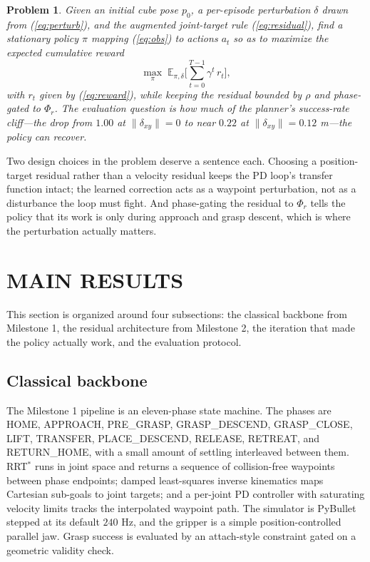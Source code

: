 \documentclass[letterpaper, 11 pt, journal, twoside]{IEEEtran}
\newtheorem{problem}{Problem}
\def\rep#1{(\ref{#1})}
\begin{document}
\begin{problem}
\label{prob:main}
Given an initial cube pose $p_0$, a per-episode perturbation $\delta$ drawn from \rep{eq:perturb}, and the augmented joint-target rule \rep{eq:residual}, find a stationary policy $\pi$ mapping \rep{eq:obs} to actions $a_t$ so as to maximize the expected cumulative reward
\begin{equation}
\max_{\pi} \; \mathbb{E}_{\pi, \delta}\Bigg[\sum_{t=0}^{T-1} \gamma^{t}\, r_t\Bigg],
\label{eq:J}
\end{equation}
with $r_t$ given by \rep{eq:reward}, while keeping the residual bounded by $\rho$ and phase-gated to $\Phi_r$. The evaluation question is how much of the planner's success-rate cliff---the drop from $1.00$ at $\|\delta_{xy}\| = 0$ to near $0.22$ at $\|\delta_{xy}\| = 0.12$ m---the policy can recover.
\end{problem}

Two design choices in the problem deserve a sentence each. Choosing a position-target residual rather than a velocity residual keeps the PD loop's transfer function intact; the learned correction acts as a waypoint perturbation, not as a disturbance the loop must fight. And phase-gating the residual to $\Phi_r$ tells the policy that its work is only during approach and grasp descent, which is where the perturbation actually matters.

\section{MAIN RESULTS}
\label{sec:main}

This section is organized around four subsections: the classical backbone from Milestone 1, the residual architecture from Milestone 2, the iteration that made the policy actually work, and the evaluation protocol.

\subsection{Classical backbone}
\label{sec:backbone}

The Milestone 1 pipeline is an eleven-phase state machine. The phases are HOME, APPROACH, PRE\_GRASP, GRASP\_DESCEND, GRASP\_CLOSE, LIFT, TRANSFER, PLACE\_DESCEND, RELEASE, RETREAT, and RETURN\_HOME, with a small amount of settling interleaved between them. RRT$^*$ \cite{Karaman2011RRTStar} runs in joint space and returns a sequence of collision-free waypoints between phase endpoints; damped least-squares inverse kinematics maps Cartesian sub-goals to joint targets; and a per-joint PD controller with saturating velocity limits tracks the interpolated waypoint path. The simulator is PyBullet \cite{Coumans2016PyBullet} stepped at its default $240$ Hz, and the gripper is a simple position-controlled parallel jaw. Grasp success is evaluated by an attach-style constraint gated on a geometric validity check.
\end{document}
